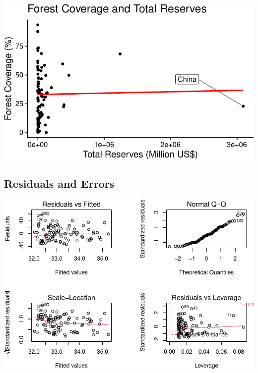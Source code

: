 \documentclass[
  12pt,
]{article}
\let\origfigure\figure
\let\endorigfigure\endfigure
\renewenvironment{figure}[1][2] {
    \expandafter\origfigure\expandafter[H]
} {
    \endorigfigure
}
\begin{document}
\begin{figure}
\centering
\includegraphics{CulbersonDeAngeliShapiro_ENV872_Project_files/figure-latex/unnamed-chunk-2-1.pdf}
\caption{Forest Coverage and Total Reserves}
\end{figure}

\newpage

\hypertarget{residuals-and-errors}{%
\subsection{Residuals and Errors}\label{residuals-and-errors}}

\begin{figure}
\centering
\includegraphics{CulbersonDeAngeliShapiro_ENV872_Project_files/figure-latex/unnamed-chunk-3-1.pdf}
\caption{Residuals from Private Credit Regression}
\end{figure}
\end{document}
